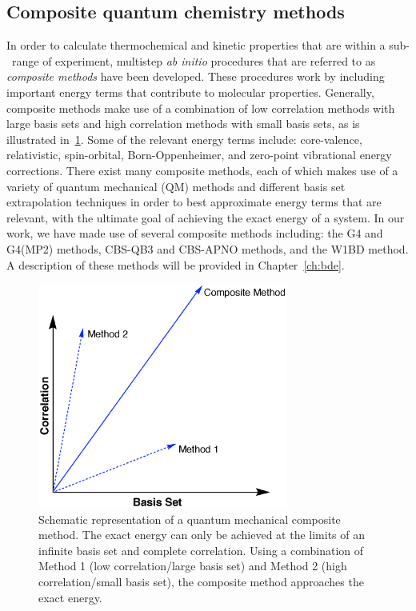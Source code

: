 \subsection{Composite quantum chemistry methods}

In order to calculate thermochemical and kinetic properties that are within a
sub-\kcalmol\ range of experiment, multistep \emph{ab initio} procedures that
are referred to as \emph{composite methods} have been
developed.\cite{Karton2016} These procedures work by including important energy
terms that contribute to molecular properties. Generally, composite methods
make use of a combination of low correlation methods with large basis sets and
high correlation methods with small basis sets, as is illustrated
in~\ref{fig:comp}. Some of the relevant energy terms include: core-valence,
relativistic, spin-orbital, Born-Oppenheimer, and zero-point vibrational energy
corrections. There exist many composite methods, each of which makes use of a
variety of quantum mechanical (QM) methods and different basis set
extrapolation techniques in order to best approximate energy terms that are
relevant, with the ultimate goal of achieving the exact energy of a system. In
our work, we have made use of several composite methods including: the G4 and
G4(MP2) methods,\cite{Curtiss2007,Curtiss2007a} CBS-QB3 and CBS-APNO
methods,\cite{Montgomery1999,Montgomery2000,Ochterski1996} and the W1BD
method.\cite{Barnes2009} A description of these methods will be provided in
Chapter~\ref{ch:bde}.

\begin{figure}[htb]
  \centering
  \includegraphics[height=20em]{figures/compositemethods.eps}
  \caption[Schematic representation of a quantum mechanical composite
  method.]{Schematic representation of a quantum mechanical composite method.
  The exact energy can only be achieved at the limits of an infinite basis set
  and complete correlation. Using a combination of Method 1 (low
  correlation/large basis set) and Method 2 (high correlation/small basis set),
  the composite method approaches the exact energy.} \label{fig:comp}
\end{figure}

